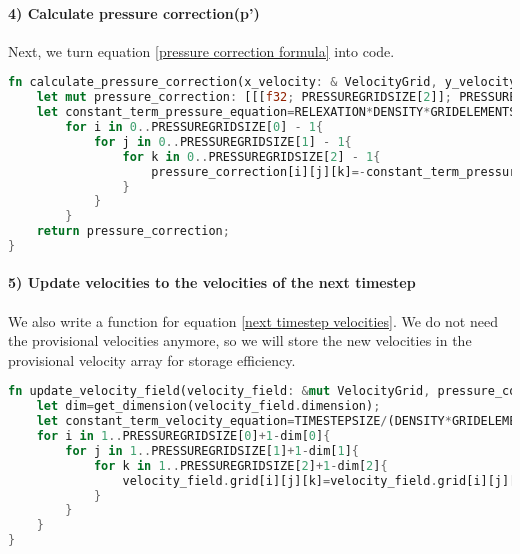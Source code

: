\documentclass{article}
\begin{document}
\paragraph{4) Calculate pressure correction(p')}

Next, we turn equation \ref{pressure correction formula} into code. 
\begin{lstlisting}[language=Rust, style=boxed, breaklines=true]
fn calculate_pressure_correction(x_velocity: & VelocityGrid, y_velocity: & VelocityGrid, z_velocity: & VelocityGrid)->[[[f32; PRESSUREGRIDSIZE[2]]; PRESSUREGRIDSIZE[1]]; PRESSUREGRIDSIZE[0]]{
    let mut pressure_correction: [[[f32; PRESSUREGRIDSIZE[2]]; PRESSUREGRIDSIZE[1]]; PRESSUREGRIDSIZE[0]]=[[[0.0; PRESSUREGRIDSIZE[2]]; PRESSUREGRIDSIZE[1]]; PRESSUREGRIDSIZE[0]];//Here we will store the pressure corrections.
    let constant_term_pressure_equation=RELEXATION*DENSITY*GRIDELEMENTSCALE/(6.0*TIMESTEPSIZE);//The lower part of the equation is this constant.
        for i in 0..PRESSUREGRIDSIZE[0] - 1{
            for j in 0..PRESSUREGRIDSIZE[1] - 1{
                for k in 0..PRESSUREGRIDSIZE[2] - 1{
                    pressure_correction[i][j][k]=-constant_term_pressure_equation*(x_velocity.grid[i+1][j+1][k+1] - x_velocity.grid[i][j+1][k+1]+ y_velocity.grid[i+1][j+1][k+1] - y_velocity.grid[i+1][j][k+1] + z_velocity.grid[i+1][j+1][k+1]-z_velocity.grid[i+1][j+1][k]);
                }
            }
        }
    return pressure_correction;
}
\end{lstlisting}

\paragraph{5) Update velocities to the velocities of the next timestep} 
We also write a function for equation \ref{next timestep velocities}. We do not need the provisional velocities anymore, so we will store the new velocities in the provisional velocity array for storage efficiency.

\begin{lstlisting}[language=Rust, style=boxed, breaklines=true]
fn update_velocity_field(velocity_field: &mut VelocityGrid, pressure_correction : &[[[f32; PRESSUREGRIDSIZE[2]]; PRESSUREGRIDSIZE[1]]; PRESSUREGRIDSIZE[0]]){
    let dim=get_dimension(velocity_field.dimension);
    let constant_term_velocity_equation=TIMESTEPSIZE/(DENSITY*GRIDELEMENTSCALE);
    for i in 1..PRESSUREGRIDSIZE[0]+1-dim[0]{
        for j in 1..PRESSUREGRIDSIZE[1]+1-dim[1]{
            for k in 1..PRESSUREGRIDSIZE[2]+1-dim[2]{
                velocity_field.grid[i][j][k]=velocity_field.grid[i][j][k]-constant_term_velocity_equation*(pressure_correction[i+dim[0]-1][j+dim[1]-1][k+dim[2]-1]- pressure_correction[i-1][j-1][k-1]);
            }
        }
    }
}
\end{lstlisting}
\end{document}

